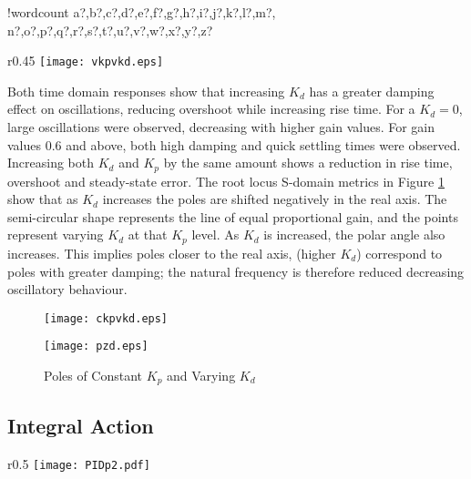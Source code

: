 \documentclass[11pt]{article}
\newcounter{words}
\newenvironment{counted}{%
  \setcounter{words}{0}
  \SearchList!{wordcount}{\stepcounter{words}}
    {a?,b?,c?,d?,e?,f?,g?,h?,i?,j?,k?,l?,m?,
    n?,o?,p?,q?,r?,s?,t?,u?,v?,w?,x?,y?,z?}
  \UndoBoundary{'}
  \SearchOrder{p;}}{%
  \StopSearching}
\begin{document}
\begin{counted}
\begin{wrapfigure}{r}{0.45\textwidth}
\centering
\vspace{-15pt} %
\texttt{[image: vkpvkd.eps]}
\vspace{-10pt}
\caption{Time-Domain Response For Varying $K_p$ and Varying $K_d$}
\label{vkpvkd}
\vspace{-15pt}
\end{wrapfigure}

Both time domain responses show that increasing \(K_d\) has a greater
damping effect on oscillations, reducing overshoot while increasing rise
time. For a \(K_d = 0\), large oscillations were observed, decreasing
with higher gain values. For gain values 0.6 and above, both high
damping and quick settling times were observed. Increasing both \(K_d\)
and \(K_p\) by the same amount shows a reduction in rise time, overshoot
and steady-state error. The root locus S-domain metrics in Figure
\ref{pzd} show that as \(K_d\) increases the poles are shifted
negatively in the real axis. The semi-circular shape represents the line
of equal proportional gain, and the points represent varying \(K_d\) at
that \(K_p\) level. As \(K_d\) is increased, the polar angle also
increases. This implies poles closer to the real axis, (higher \(K_d\))
correspond to poles with greater damping; the natural frequency is
therefore reduced decreasing oscillatory behaviour.

\begin{figure}[H]
\centering
\begin{minipage}{.455\textwidth}
 \centering
 \texttt{[image: ckpvkd.eps]}
 \caption{Time-Domain Response For Constant $K_p$ and Varying $K_d$}
 \label{ckpvkd}
\end{minipage}
\hfill
\begin{minipage}{.455\textwidth}
\centering
\texttt{[image: pzd.eps]}
\caption{Poles of Constant $K_p$ and Varying $K_d$}
\label{pzd}
\end{minipage}
\vspace{-20pt}
\end{figure}

\subsection{Integral Action}\label{integral-action}

\begin{wrapfigure}{r}{0.5\textwidth}
\centering
\vspace{-15pt} %
\texttt{[image: PIDp2.pdf]}
\vspace{-10pt}
\caption{PID Feedback Controller}
\label{PIDp2}
\vspace{-15pt}
\end{wrapfigure}


\end{counted}
\end{document}
